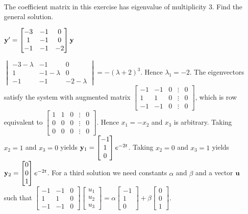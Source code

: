 \documentclass{ximera}
\begin{document}
 \begin{problem}\label{exer:10.5.32}
 The coefficient matrix in this exercise
has eigenvalue of multiplicity $3$. Find the
general solution.

${\bf y}'= \begin{bmatrix}-3&-1&0\\1&-1&0\\-1&-1&-2\end{bmatrix}{\bf y}$

\begin{solution}
    $ \begin{vmatrix}-3-\lambda&-1&0\\1&-1-\lambda&0\\-1&-1&-2-\lambda\end{vmatrix}
=-(\lambda+2)^3$.
Hence $\lambda_1=-2$.
The eigenvectors
 satisfy the system with  augmented matrix
$  \begin{bmatrix}-1&-1&0&\vdots&0\\1&1&0&
\vdots&0\\-1&-1&0&\vdots&0 \end{bmatrix}$,
which is row equivalent to
$  \begin{bmatrix}1&1&0&\vdots&0\\0&0&0&
\vdots&0\\0&0&0&\vdots&0 \end{bmatrix}$.
Hence  $x_1=-x_2$ and $x_3$ is arbitrary.  Taking $x_2=1$ and $x_3=0$
yields
${\bf y}_1= \begin{bmatrix}-1\\1\\0 \end{bmatrix}e^{-2t}$.
Taking  $x_2=0$ and $x_3=1$ yields
  ${\bf y}_2= \begin{bmatrix}0\\0\\1 \end{bmatrix}e^{-2t}$.
For a third solution we need constants $\alpha$ and $\beta$  and a
vector ${\bf u}$ such that
$  \begin{bmatrix}-1&-1&0\\1&1&0\\-1&-1&0 \end{bmatrix} \begin{bmatrix}u_1\\u_2\\u_3 \end{bmatrix}
=\alpha  \begin{bmatrix}-1\\1\\0 \end{bmatrix}+\beta \begin{bmatrix}0\\0\\1 \end{bmatrix}$.

\end{solution}
\end{problem}
\end{document}
